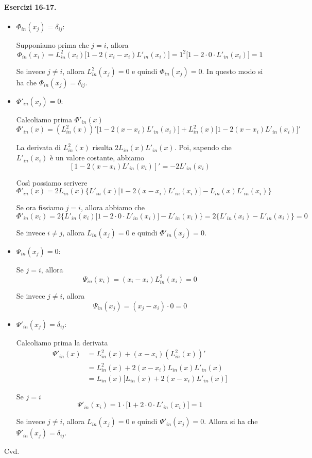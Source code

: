 \paragraph{Esercizi 16-17.} 
\begin{itemize}
  \item $\Phi_{in}(x_j) = \delta_{ij}$:

Supponiamo prima che $j = i$, allora
\[
\Phi_{in}(x_i) = L^2_{in}(x_i)\Big[1 - 2(x_i - x_i)L'_{in}(x_i)\Big] = 1^2\Big[1 - 2 \cdot 0 \cdot L'_{in}(x_i)\Big] = 1
\]

Se invece $j \neq i$, allora $L^2_{in}(x_j) = 0$ e quindi $\Phi_{in}(x_j) = 0$. In questo modo si ha che $\Phi_{in}(x_j) = \delta_{ij}$.

  \item $\Phi'_{in}(x_j) = 0$:

Calcoliamo prima $\Phi'_{in}(x)$
\[
\Phi'_{in}(x) = (L^2_{in}(x))'\Big[1 - 2(x - x_i)L'_{in}(x_i)\Big] + L^2_{in}(x)\Big[1 - 2(x - x_i)L'_{in}(x_i)\Big]'
\]

La derivata di $L^2_{in}(x)$ risulta $2L_{in}(x)L'_{in}(x)$. Poi, sapendo che $L'_{in}(x_i)$ è un valore costante, abbiamo
\[
[1 - 2(x - x_i)L'_{in}(x_i)]' = -2L'_{in}(x_i)
\]

Così possiamo scrivere
\[
\Phi'_{in}(x) = 2L_{in}(x)\Big\{L'_{in}(x)\big[1 - 2(x - x_i)L'_{in}(x_i)\big] - L_{in}(x)L'_{in}(x_i)\Big\}
\]

Se ora fissiamo $j = i$, allora abbiamo che
\[
\Phi'_{in}(x_i) = 2\Big\{L'_{in}(x_i)\big[1 - 2 \cdot 0 \cdot L'_{in}(x_i)\big] - L'_{in}(x_i)\Big\} = 2\Big\{L'_{in}(x_i) - L'_{in}(x_i)\Big\} = 0
\]

Se invece $i \neq j$, allora $L_{in}(x_j) = 0$ e quindi $\Phi'_{in}(x_j) = 0$.

  \item $\Psi_{in}(x_j) = 0$:

Se $j = i$, allora
\[
\Psi_{in}(x_i) = (x_i - x_i)L^2_{in}(x_i) = 0
\]

Se invece $j \neq i$, allora
\[
\Psi_{in}(x_j) = (x_j - x_i) \cdot 0 = 0
\]

  \item $\Psi'_{in}(x_j) = \delta_{ij}$:
  
Calcoliamo prima la derivata
\begin{align*}
\Psi'_{in}(x)& = L^2_{in}(x) + (x - x_i)(L^2_{in}(x))' \\
  &= L^2_{in}(x) + 2(x - x_i)L_{in}(x)L'_{in}(x) \\
  &= L_{in}(x)\Big[L_{in}(x) + 2(x - x_i)L'_{in}(x)\Big]
\end{align*}

Se $j = i$
\[
\Psi'_{in}(x_i) = 1 \cdot \Big[1 + 2 \cdot 0 \cdot L'_{in}(x_i)\Big] = 1
\]

Se invece $j \neq i$, allora $L_{in}(x_j) = 0$ e quindi $\Psi'_{in}(x_j) = 0$. Allora si ha che $\Psi'_{in}(x_j) = \delta_{ij}$.
\end{itemize}

Cvd.